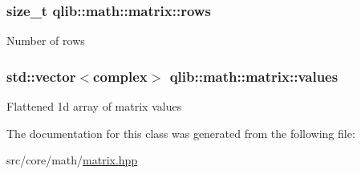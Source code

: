 \subsubsection[{\texorpdfstring{rows}{rows}}]{\setlength{\rightskip}{0pt plus 5cm}size\+\_\+t qlib\+::math\+::matrix\+::rows\hspace{0.3cm}{\ttfamily [private]}}\hypertarget{classqlib_1_1math_1_1matrix_af29b6ea4316eb972bbdc55da6e54dbb3}{}\label{classqlib_1_1math_1_1matrix_af29b6ea4316eb972bbdc55da6e54dbb3}
Number of rows 
\subsubsection[{\texorpdfstring{values}{values}}]{\setlength{\rightskip}{0pt plus 5cm}std\+::vector$<${\bf complex}$>$ qlib\+::math\+::matrix\+::values\hspace{0.3cm}{\ttfamily [private]}}\hypertarget{classqlib_1_1math_1_1matrix_ad764d65375ba1e50381f640bdc181c0b}{}\label{classqlib_1_1math_1_1matrix_ad764d65375ba1e50381f640bdc181c0b}
Flattened 1d array of matrix values 

The documentation for this class was generated from the following file\+:\begin{DoxyCompactItemize}
\item 
src/core/math/\hyperlink{matrix_8hpp}{matrix.\+hpp}\end{DoxyCompactItemize}
